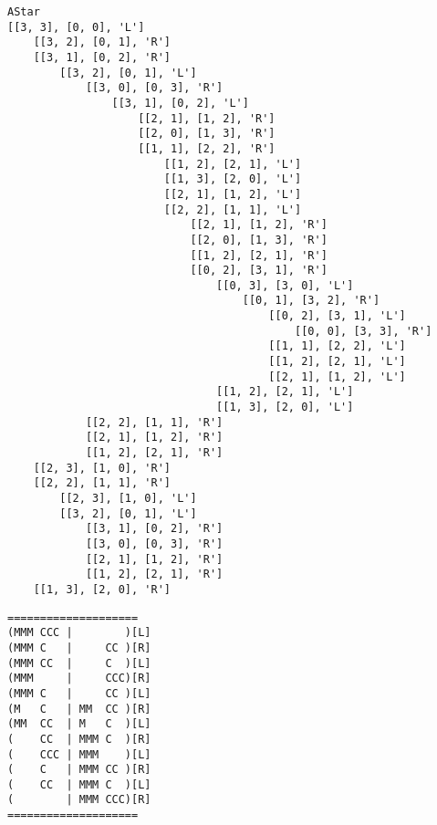 \documentclass{article}
\begin{document}
\begin{verbatim}
AStar
[[3, 3], [0, 0], 'L']
    [[3, 2], [0, 1], 'R']
    [[3, 1], [0, 2], 'R']
        [[3, 2], [0, 1], 'L']
            [[3, 0], [0, 3], 'R']
                [[3, 1], [0, 2], 'L']
                    [[2, 1], [1, 2], 'R']
                    [[2, 0], [1, 3], 'R']
                    [[1, 1], [2, 2], 'R']
                        [[1, 2], [2, 1], 'L']
                        [[1, 3], [2, 0], 'L']
                        [[2, 1], [1, 2], 'L']
                        [[2, 2], [1, 1], 'L']
                            [[2, 1], [1, 2], 'R']
                            [[2, 0], [1, 3], 'R']
                            [[1, 2], [2, 1], 'R']
                            [[0, 2], [3, 1], 'R']
                                [[0, 3], [3, 0], 'L']
                                    [[0, 1], [3, 2], 'R']
                                        [[0, 2], [3, 1], 'L']
                                            [[0, 0], [3, 3], 'R']
                                        [[1, 1], [2, 2], 'L']
                                        [[1, 2], [2, 1], 'L']
                                        [[2, 1], [1, 2], 'L']
                                [[1, 2], [2, 1], 'L']
                                [[1, 3], [2, 0], 'L']
            [[2, 2], [1, 1], 'R']
            [[2, 1], [1, 2], 'R']
            [[1, 2], [2, 1], 'R']
    [[2, 3], [1, 0], 'R']
    [[2, 2], [1, 1], 'R']
        [[2, 3], [1, 0], 'L']
        [[3, 2], [0, 1], 'L']
            [[3, 1], [0, 2], 'R']
            [[3, 0], [0, 3], 'R']
            [[2, 1], [1, 2], 'R']
            [[1, 2], [2, 1], 'R']
    [[1, 3], [2, 0], 'R']
\end{verbatim}
\newpage
\begin{verbatim}
====================
(MMM CCC |        )[L]
(MMM C   |     CC )[R]
(MMM CC  |     C  )[L]
(MMM     |     CCC)[R]
(MMM C   |     CC )[L]
(M   C   | MM  CC )[R]
(MM  CC  | M   C  )[L]
(    CC  | MMM C  )[R]
(    CCC | MMM    )[L]
(    C   | MMM CC )[R]
(    CC  | MMM C  )[L]
(        | MMM CCC)[R]
====================
\end{verbatim}
\end{document}
